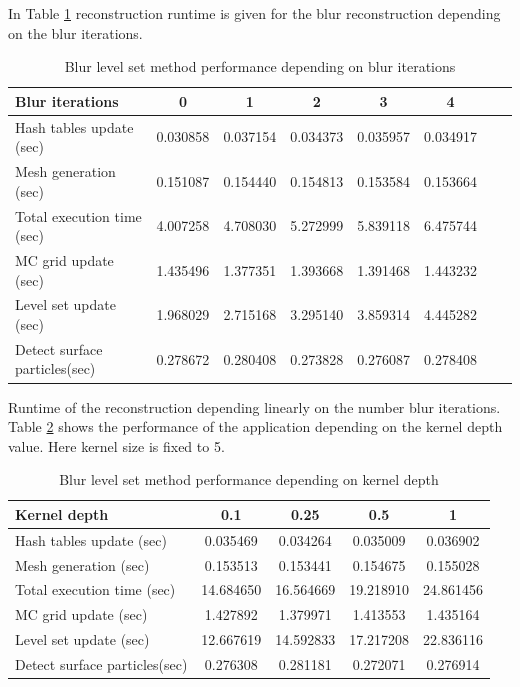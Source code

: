 In Table \ref{tab:bi_perf_analysis} reconstruction runtime is given for the blur reconstruction depending on the blur iterations. 
\begin{table}[H]
	\begin{center}
		\scriptsize
		\begin{tabular}{|l|c|c|c|c|c|c|c|}
			\hline
			Blur iterations & 0 & 1 & 2 & 3 & 4 \\
			\hline
			Hash tables update (sec)		&	0.030858	&	0.037154	&	0.034373	&	0.035957	&	0.034917\\
			Mesh generation	(sec)			&	0.151087	&	0.154440	&	0.154813	&	 0.153584	&	0.153664\\
			Total execution time (sec)		&	4.007258	&	4.708030	&	5.272999	&	5.839118	&	6.475744\\
			MC grid update (sec)			&	1.435496	&	1.377351	&	1.393668	&	1.391468	&	1.443232\\
			Level set update (sec)			&	1.968029	&	2.715168	&	3.295140	&	3.859314	&	4.445282\\
			Detect surface particles(sec)	&	0.278672	&	0.280408	&	0.273828	&	0.276087	&	0.278408\\
			\hline
		\end{tabular}
	\end{center}
	\caption{Blur level set method performance depending on blur iterations}
	\label{tab:bi_perf_analysis}
\end{table}
Runtime of the reconstruction depending linearly on the number blur iterations.\\

Table \ref{tab:kd_perf_analysis} shows the performance of the application depending on the kernel depth value. Here kernel size is fixed to 5.
\begin{table}[H]
	\begin{center}
		\scriptsize
		\begin{tabular}{|l|c|c|c|c|}
			\hline
			Kernel depth & 0.1 & 0.25 & 0.5 & 1 \\
			\hline
			Hash tables update (sec)		&	0.035469	&	0.034264	&	0.035009	&	0.036902\\
			Mesh generation	(sec)			&	0.153513	&	0.153441	&	0.154675	&	 0.155028\\
			Total execution time (sec)		&	14.684650	&	16.564669	&	19.218910	&	24.861456\\
			MC grid update (sec)			&	1.427892	&	1.379971	&	1.413553	&	1.435164\\
			Level set update (sec)			&	12.667619	&	14.592833	&	17.217208	&	22.836116\\
			Detect surface particles(sec)	&	0.276308	&	0.281181	&	0.272071	&	0.276914\\
			\hline
		\end{tabular}
	\end{center}
	\caption{Blur level set method performance depending on kernel depth}
	\label{tab:kd_perf_analysis}
\end{table}

